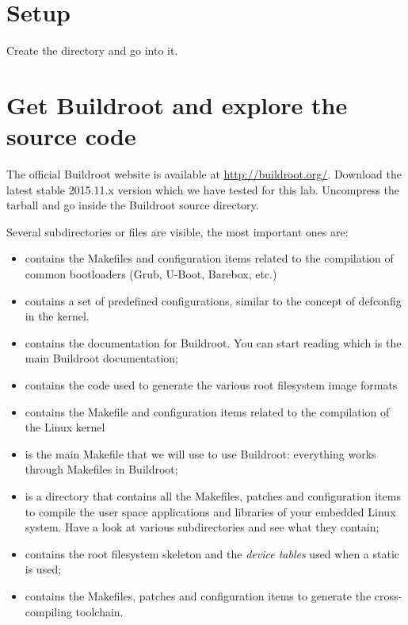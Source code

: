 
\section{Setup}

Create the  directory and
go into it.

\section{Get Buildroot and explore the source code}

The official Buildroot website is available at
\url{http://buildroot.org/}. Download the latest stable 2015.11.x
version which we have tested for this lab. Uncompress the tarball
and go inside the Buildroot source directory.

Several subdirectories or files are visible, the most important ones
are:

\begin{itemize}
\item {} contains the Makefiles and configuration items
  related to the compilation of common bootloaders (Grub, U-Boot,
  Barebox, etc.)
\item {} contains a set of predefined configurations,
  similar to the concept of defconfig in the kernel.
\item {} contains the documentation for Buildroot. You can
  start reading  which is the main Buildroot
  documentation;
\item {} contains the code used to generate the various root
  filesystem image formats
\item {} contains the Makefile and configuration items
  related to the compilation of the Linux kernel
\item {} is the main Makefile that we will use to use
  Buildroot: everything works through Makefiles in Buildroot;
\item {} is a directory that contains all the Makefiles,
  patches and configuration items to compile the user space
  applications and libraries of your embedded Linux system. Have a
  look at various subdirectories and see what they contain;
\item {} contains the root filesystem skeleton and the {\em
    device tables} used when a static  is used;
\item {} contains the Makefiles, patches and
  configuration items to generate the cross-compiling toolchain.
\end{itemize}

